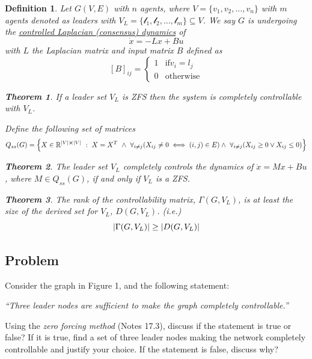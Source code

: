 \documentclass[]{article}
\numberwithin{equation}{section}
\newcommand{\R}{\mathbb{R}}
\newcommand{\st}{\ : \ }
\newtheorem{definition}{Definition}
\newtheorem{theorem}{Theorem}
\begin{document}
\begin{definition}
    Let $G(V,E)$ with $n$ agents, where $V = \{v_1,v_2,\dots,v_n\}$ with $m$ agents denoted as leaders with $V_L = \{\mathcal{l}_1, \mathcal{l}_2, \dots, \mathcal{l}_m\} \subseteq V$.
    We say $G$ is undergoing the \underline{\emph{controlled Laplacian (consensus) dynamics}} of \[
        \dot{x} = -L x + B u
    \] with $L$ the Laplacian matrix and input matrix $B$ defined as \[
        [B]_{ij} = \begin{cases}
            1 & \text{if} v_i = l_j\\
            0 & \text{otherwise}
        \end{cases}
    \]
    \begin{theorem}
        If a leader set $V_L$ is ZFS then the system is completely controllable with $V_L$.
    \end{theorem}
    Define the following set of matrices \[
        Q_{ss}(G) 
            = \qty{
                X \in \R^{\abs{V} \cross \abs{V}} 
                \st X = X^T \
                \land \ \forall_{i \neq j} \qty(X_{ij} \neq 0 \iff (i,j) \in E)
                \land \ \forall_{i \neq j} \qty(X_{ij} \geq 0 \lor X_{ij} \leq 0)
            }
    \]
    \begin{theorem}
        The leader set $V_L$ completely controls the dynamics of $\dot{x} = Mx + Bu$, where $M \in Q_{ss}(G)$, if and only if $V_L$ is a ZFS.
    \end{theorem}
    \begin{theorem}
        The rank of the controllability matrix, $\Gamma(G,V_L)$, is at least the size of the derived set for $V_L$, $D(G,V_L)$. 
        (i.e.)\[
            \abs{\Gamma(G,V_L)} \geq \abs{D(G,V_L)}
        \]
    \end{theorem}
\end{definition}

\newpage
\subsection*{Problem}
Consider the graph in Figure 1, and the following statement:

\emph{``Three leader nodes are sufficient to make the graph completely
controllable.''}

Using the \emph{zero forcing method} (Notes 17.3), discuss if the
statement is true or false? If it is true, find a set of three leader
nodes making the network completely controllable and justify your
choice. If the statement is false, discuss why?
\end{document}
